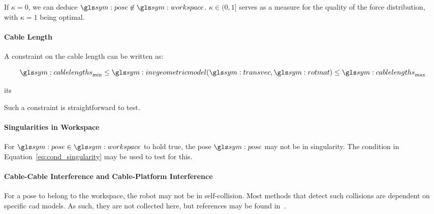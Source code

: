 				If	$\kappa  =	0$,  we  can  deduce  $\pose  \not\in
				\workspace$.  $\kappa \in (0, 1]$ serves as a measure for the
				quality of the force distribution, with $\kappa = 1$ being
				optimal.

			\paragraph{Cable Length}%
			\label{sec:cable_length}

				A constraint on the cable length can be written as:

				\begin{equation}
					\cablelengths_{\min}
						\leq \invgeometricmodel(\transvec, \rotmatbare)
						\leq \cablelengths_{\max}
				\end{equation}

				its %

				Such a constraint is straightforward to test.


			\paragraph{Singularities in Workspace}%
			\label{sec:singularities_in_workspace}

				For $\pose\in\workspace$ to hold true, the pose $\pose$ may not
				be in singularity. The condition in
				Equation~\ref{eq:cond_singularity} may be used to test for this.

			\paragraph{Cable-Cable Interference and Cable-Platform Interference}%
			\label{sec:cable_cable_interference_and_cable_platform_interference}

				For a pose to belong to the workspace, the robot may not be in
				self-collision. Most methods that detect such collisions are
				dependent on specific \gls{cad} models. As such, they are not
				collected here, but references may be found in~\cite[][page
				171]{bib:cdpr:cable_driven_parallel_robots_theory_and_application}.

